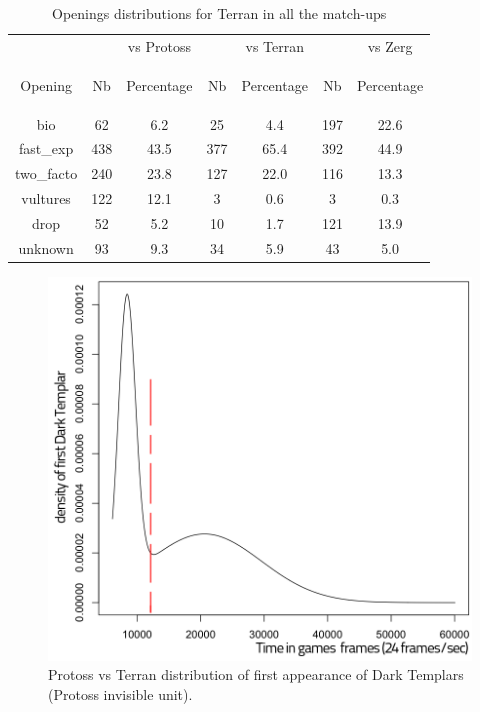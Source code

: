 \begin{table}[h]
\caption{Openings distributions for Terran in all the match-ups}
\begin{center}
\begin{tabular}{|c|cc|cc|cc|}
\hline
&  & vs Protoss &  & vs Terran &  & vs Zerg \\
Opening
& Nb
& \begin{scriptsize}Percentage\end{scriptsize}
& Nb
& \begin{scriptsize}Percentage\end{scriptsize}
& Nb
& \begin{scriptsize}Percentage\end{scriptsize} \\ \hline
bio 	    & 62 	& 6.2 	& 25 	& 4.4   & 197 	& 22.6 \\
fast\_exp 	& 438 	& 43.5 	& 377 	& 65.4  & 392 	& 44.9 \\
two\_facto 	& 240 	& 23.8  & 127 	& 22.0  & 116 	& 13.3 \\
vultures 	& 122 	& 12.1  & 3 	& 0.6   & 3 	& 0.3  \\
drop 	    & 52 	& 5.2   & 10 	& 1.7   & 121 	& 13.9 \\
unknown 	& 93 	& 9.3   & 34 	& 5.9   & 43 	& 5.0 \\ \hline
\end{tabular}
\label{openings_distrib}
\end{center}
\end{table}

\begin{figure}[htp]
\centerline{\includegraphics[width=0.6\columnwidth]{images/PvTfastDT.png}}
\caption{Protoss vs Terran distribution of first appearance of Dark Templars (Protoss invisible unit).}
\label{PvTfastDT}
\end{figure}

